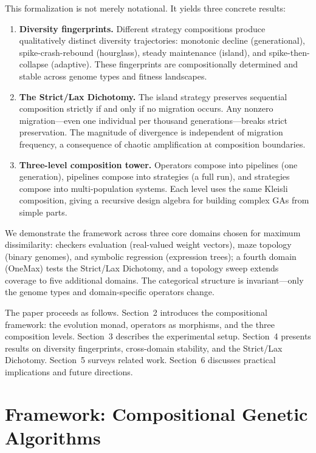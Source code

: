 \documentclass[sigconf,anonymous]{acmart}
\begin{document}
This formalization is not merely notational. It yields three concrete results:

\begin{enumerate}[nosep]
  \item \textbf{Diversity fingerprints.} Different strategy compositions produce qualitatively distinct diversity trajectories: monotonic decline (generational), spike-crash-rebound (hourglass), steady maintenance (island), and spike-then-collapse (adaptive). These fingerprints are compositionally determined and stable across genome types and fitness landscapes.

  \item \textbf{The Strict/Lax Dichotomy.} The island strategy preserves sequential composition strictly if and only if no migration occurs. Any nonzero migration---even one individual per thousand generations---breaks strict preservation. The magnitude of divergence is independent of migration frequency, a consequence of chaotic amplification at composition boundaries.

  \item \textbf{Three-level composition tower.} Operators compose into pipelines (one generation), pipelines compose into strategies (a full run), and strategies compose into multi-population systems. Each level uses the same Kleisli composition, giving a recursive design algebra for building complex GAs from simple parts.
\end{enumerate}

We demonstrate the framework across three core domains chosen for maximum dissimilarity: checkers evaluation (real-valued weight vectors), maze topology (binary genomes), and symbolic regression (expression trees); a fourth domain (OneMax) tests the Strict/Lax Dichotomy, and a topology sweep extends coverage to five additional domains. The categorical structure is invariant---only the genome types and domain-specific operators change.

The paper proceeds as follows. Section~2 introduces the compositional framework: the evolution monad, operators as morphisms, and the three composition levels. Section~3 describes the experimental setup. Section~4 presents results on diversity fingerprints, cross-domain stability, and the Strict/Lax Dichotomy. Section~5 surveys related work. Section~6 discusses practical implications and future directions.

\section{Framework: Compositional Genetic Algorithms}
\end{document}
